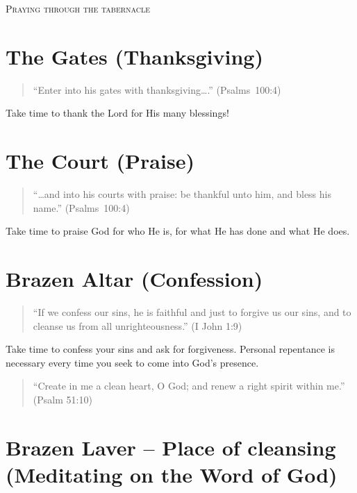 \begin{center}
\mbox{}

\bigskip

\LARGE\textsc{Praying through the tabernacle}

\end{center}

\pagestyle{empty}
\setlength{\parindent}{0em}

\section{The Gates (Thanksgiving)}


\begin{quote}
    ``Enter into his gates with thanksgiving\ldots{}.'' (Psalms~100:4)
\end{quote}

Take time to thank the Lord for His many blessings!


\section{The Court (Praise)}

\begin{quote}
``\dots{}and into his courts with praise: be thankful unto him, and bless his name.'' (Psalms~100:4)
\end{quote}

Take time to praise God for who He is, for what He has done and what He does.



\section{Brazen Altar (Confession)}

\begin{quote}
``If we confess our sins, he is faithful and just to forgive us our sins,
    and to cleanse us from all unrighteousness.'' (I John 1:9)
\end{quote}

Take time to confess your sins and ask for forgiveness.
Personal repentance is necessary every time you seek to come into God’s presence.

\begin{quote}
``Create in me a clean heart, O God; and renew a right spirit within me.'' (Psalm 51:10)
\end{quote}


\section{Brazen Laver – Place of cleansing (Meditating on the Word of God)}


